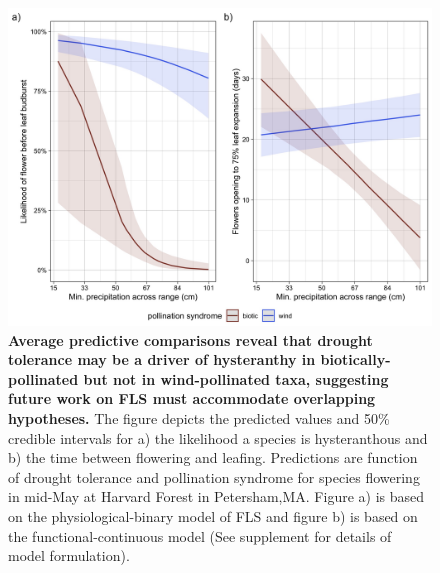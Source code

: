 \documentclass[12pt]{article}
\begin{document}
            \begin{figure}[ht]
    \centering
    \includegraphics[width=\textwidth]{..//figure/HF_apcs.jpeg}
    \caption{\textbf{Average predictive comparisons reveal that drought tolerance may be a driver of hysteranthy in biotically-pollinated but not in wind-pollinated taxa, suggesting future work on FLS must accommodate overlapping hypotheses.} The figure depicts the predicted values and 50\% credible intervals for a) the likelihood a species is hysteranthous and b) the time between flowering and leafing. Predictions are function of drought tolerance and pollination syndrome for species flowering in mid-May at Harvard Forest in Petersham,MA. Figure a) is based on the physiological-binary model of FLS and figure b) is based on the functional-continuous model (See supplement for details of model formulation). }
    \label{fig:Figure 5}
    \end{figure}




\end{document}
